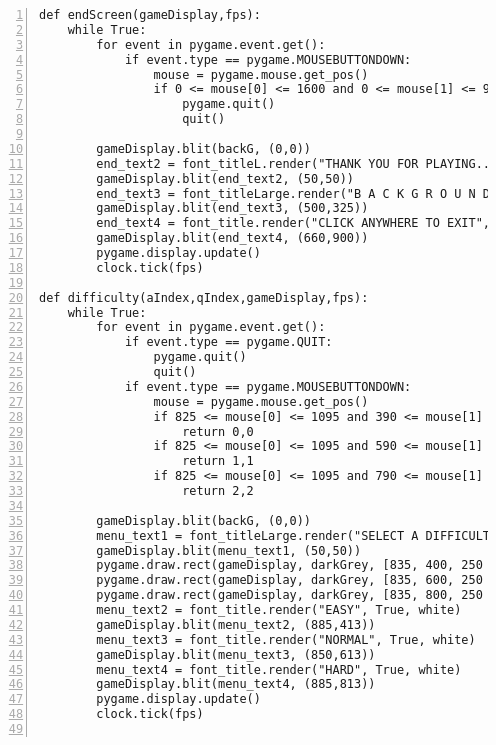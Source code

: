 \documentclass[12pt]{report}
\begin{document}
\begin{Verbatim}[numbers=left, frame=single]
def endScreen(gameDisplay,fps):
    while True:
        for event in pygame.event.get():
            if event.type == pygame.MOUSEBUTTONDOWN:
                mouse = pygame.mouse.get_pos()
                if 0 <= mouse[0] <= 1600 and 0 <= mouse[1] <= 900:
                    pygame.quit()
                    quit()

        gameDisplay.blit(backG, (0,0))
        end_text2 = font_titleL.render("THANK YOU FOR PLAYING...", True, white)
        gameDisplay.blit(end_text2, (50,50))
        end_text3 = font_titleLarge.render("B A C K G R O U N D", True, white)
        gameDisplay.blit(end_text3, (500,325))
        end_text4 = font_title.render("CLICK ANYWHERE TO EXIT", True, white)
        gameDisplay.blit(end_text4, (660,900))
        pygame.display.update()                                                                     
        clock.tick(fps)

def difficulty(aIndex,qIndex,gameDisplay,fps):
    while True:
        for event in pygame.event.get():
            if event.type == pygame.QUIT:
                pygame.quit()
                quit()
            if event.type == pygame.MOUSEBUTTONDOWN:
                mouse = pygame.mouse.get_pos()
                if 825 <= mouse[0] <= 1095 and 390 <= mouse[1] <= 470:
                    return 0,0
                if 825 <= mouse[0] <= 1095 and 590 <= mouse[1] <= 670:
                    return 1,1
                if 825 <= mouse[0] <= 1095 and 790 <= mouse[1] <= 870:
                    return 2,2

        gameDisplay.blit(backG, (0,0))  
        menu_text1 = font_titleLarge.render("SELECT A DIFFICULTY", True, white)
        gameDisplay.blit(menu_text1, (50,50))
        pygame.draw.rect(gameDisplay, darkGrey, [835, 400, 250 , 60])
        pygame.draw.rect(gameDisplay, darkGrey, [835, 600, 250 , 60])
        pygame.draw.rect(gameDisplay, darkGrey, [835, 800, 250 , 60])
        menu_text2 = font_title.render("EASY", True, white)
        gameDisplay.blit(menu_text2, (885,413))
        menu_text3 = font_title.render("NORMAL", True, white)
        gameDisplay.blit(menu_text3, (850,613))
        menu_text4 = font_title.render("HARD", True, white)
        gameDisplay.blit(menu_text4, (885,813))
        pygame.display.update()                                                                     
        clock.tick(fps)


\end{Verbatim}
\end{document}
